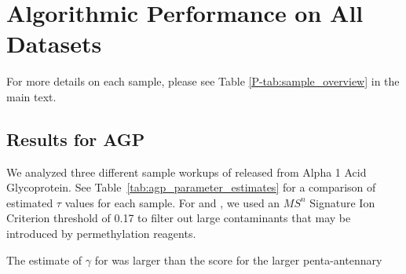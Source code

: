 
\section{Algorithmic Performance on All Datasets}\label{sec:algorithm_performance}
    For more details on each sample, please see Table \ref{P-tab:sample_overview} in
    the main text.

\subsection{Results for AGP}
    
    We analyzed three different sample workups of \nglycans released from Alpha 1 Acid
    Glycoprotein. See Table~\ref{tab:agp_parameter_estimates} for a comparison of estimated $\tau$
    values for each sample. For \dpagp and \rpagp, we used an $MS^n$ Signature Ion Criterion
    threshold of 0.17 to filter out large contaminants that may be introduced by permethylation
    reagents.

    The estimate of $\gamma$ for \agp was larger than the score for the larger penta-antennary 

